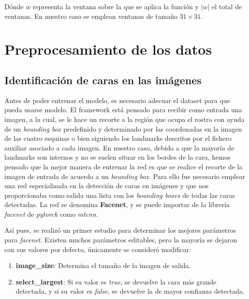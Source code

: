             \noindent Dónde $w$ representa la ventana sobre la que se aplica la función y $|w|$ el total de ventanas. En nuestro caso se emplean ventanas de tamaño $31\times 31$.

\section{Preprocesamiento de los datos}
        
        \subsection{Identificación de caras en las imágenes}
            \noindent Antes de poder entrenar el modelo, es necesario adecuar el dataset para que pueda usarse modelo. El framework está pensado para recibir como entrada una imagen, a la cual, se le hace un recorte a la región que ocupa el rostro con ayuda de un \textit{bounding box} predefinido y determinado por las coordenadas en la imagen de las cuatro esquinas o bien siguiendo los landmarks descritos por el fichero auxiliar asociado a cada imagen. En nuestro caso, debido a que la mayoría de landmarks son internos y no se suelen situar en los bordes de la cara, hemos pensado que la mejor manera de entrenar la red es que se realice el recorte de la imagen de entrada de acuerdo a un \textit{bounding box}. Para ello fue necesario emplear una red especializada en la detección de caras en imágenes y que nos proporcionaba como salida una lista con los \textit{bounding boxes} de todas las caras detectadas. La red se denomina \textbf{Facenet}, y se puede importar de la librería \textit{facenet} de \textit{pytorch} como \textit{mtcnn}.

            \medskip

            \noindent Así pues, se realizó un primer estudio para determinar los mejores parámetros para \textit{facenet}. Existen muchos parámetros editables, pero la mayoría se dejaron con sus valores por defecto, únicamente se consideró modificar: 

            \begin{enumerate}
                \item \textbf{image\_size}: Determina el tamaño de la imagen de salida.
                \item \textbf{select\_largest}: Si su valor es \textit{true}, se devuelve la cara más grande detectada, y si su valor es \textit{false}, se devuelve la de mayor confianza detectada.
            \end{enumerate}


